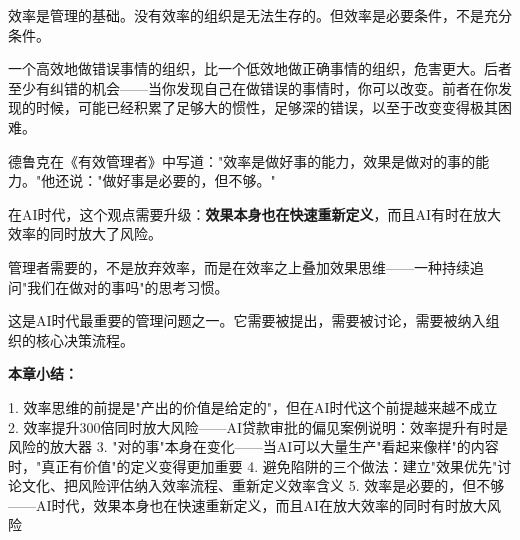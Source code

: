 效率是管理的基础。没有效率的组织是无法生存的。但效率是必要条件，不是充分条件。

一个高效地做错误事情的组织，比一个低效地做正确事情的组织，危害更大。后者至少有纠错的机会——当你发现自己在做错误的事情时，你可以改变。前者在你发现的时候，可能已经积累了足够大的惯性，足够深的错误，以至于改变变得极其困难。

德鲁克在《有效管理者》中写道："效率是做好事的能力，效果是做对的事的能力。"他还说："做好事是必要的，但不够。"

在AI时代，这个观点需要升级：\textbf{效果本身也在快速重新定义}，而且AI有时在放大效率的同时放大了风险。

管理者需要的，不是放弃效率，而是在效率之上叠加效果思维——一种持续追问"我们在做对的事吗"的思考习惯。

这是AI时代最重要的管理问题之一。它需要被提出，需要被讨论，需要被纳入组织的核心决策流程。


\textbf{本章小结：}

1. 效率思维的前提是"产出的价值是给定的"，但在AI时代这个前提越来越不成立
2. 效率提升300倍同时放大风险——AI贷款审批的偏见案例说明：效率提升有时是风险的放大器
3. "对的事"本身在变化——当AI可以大量生产"看起来像样"的内容时，"真正有价值"的定义变得更加重要
4. 避免陷阱的三个做法：建立"效果优先"讨论文化、把风险评估纳入效率流程、重新定义效率含义
5. 效率是必要的，但不够——AI时代，效果本身也在快速重新定义，而且AI在放大效率的同时有时放大风险
